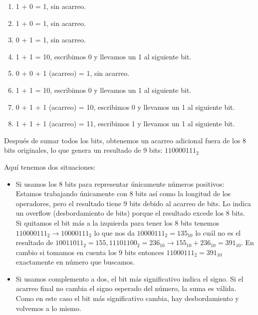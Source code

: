 \documentclass[12pt,letterpaper]{article}
\newcommand{\imp}{\rightarrow}
\begin{document}
\begin{enumerate}
    \begin{enumerate}[label=\arabic*)]
    \item 1 + 0 = 1, sin acarreo.
      
    \item 1 + 0 = 1, sin acarreo.
      
    \item 0 + 1 = 1, sin acarreo.
      
    \item 1 + 1 = 10, escribimos 0 y llevamos un 1 al siguiente bit.
      
    \item 0 + 0 + 1 (acarreo) = 1, sin acarreo.

    \item 1 + 1 = 10, escribimos 0 y llevamos un 1 al siguiente bit.
      
    \item 0 + 1 + 1 (acarreo) = 10, escribimos 0 y llevamos un 1 al siguiente bit.
      
    \item 1 + 1 + 1 (acarreo) = 11, escribimos 1 y llevamos un 1 al siguiente bit.
    \end{enumerate}
    
    Después de sumar todos los bits, obtenemos un acarreo adicional fuera de los 8 bits originales, lo que genera un resultado de 9 bits: $110000111_2$
    
    Aquí tenemos dos situaciones:
    \begin{itemize}
    \item Si usamos los 8 bits para representar únicamente números positivos:\\
      Estamos trabajando únicamente con 8 bits así como la longitud de los operadores, pero el resultado tiene 9 bits debido al acarreo de bits. Lo indica un overflow (desbordamiento de bits) porque el resultado excede los 8 bits.\\
      Si quitamos el bit más a la izquierda para tener los 8 bits tenemos $110000111_2 \imp 10000111_2$ lo que nos da $10000111_2 = 135_{10}$ lo cuál no es el resultado de $10011011_2 = 155, 11101100_2 = 236_{10} \imp 155_{10} + 236_{10} = 391_{10}$. En cambio si tomamos en cuenta los 9 bits entonces $11000111_2 = 391_{10}$ exactamente en n\'{u}mero que buscamos.

    \item Si usamos complemento a dos,  el bit más significativo indica el signo. Si el acarreo final no cambia el signo esperado del número, la suma es válida.
      Como en este caso el bit más significativo cambia, hay desbordamiento y volvemos a lo mismo.
    \end{itemize}
    \bigskip
    

\end{enumerate}
\end{document}
